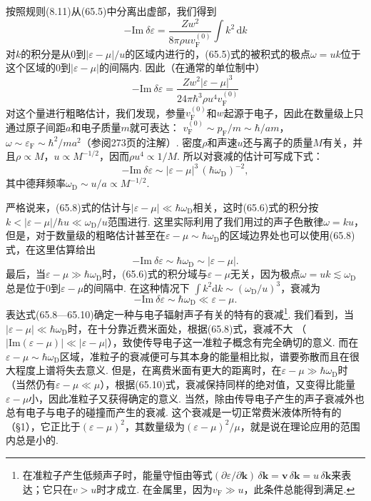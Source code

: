 按照规则(8.11)从(65.5)中分离出虚部，我们得到
\begin{equation}
-\mathrm{Im}\ \delta\varepsilon=\frac{Zw^2}{8\pi\rho uv^{(0)}_{\mathrm F}}
\int k^2\,\mathrm{d}k
\end{equation}
对$k$的积分是从0到$|\varepsilon-\mu|/u$的区域内进行的，(65.5)式的被积式的极点$\omega=uk$位于这个区域的0到$|\varepsilon-\mu|$的间隔内. 因此（在通常的单位制中）
\begin{equation}
-\mathrm{Im}\ \delta\varepsilon=
\frac{Zw^2|\varepsilon-\mu|^3}{24\pi\hbar^3\rho u^4v^{(0)}_{\mathrm F}}
\end{equation}
对这个量进行粗略估计，我们发现，参量$v^{(0)}_{\mathrm F}$和$w$起源于电子，因此在数量级上只通过原子间距$a$和电子质量$m$就可表达：
$v^{(0)}_{\mathrm F}\sim p_{\mathrm F}/m\sim\hbar/am$，
$\omega\sim\varepsilon_{\mathrm F}\sim\hbar^2/ma^2$（参阅273页的注解）. 密度$\rho$和声速$u$还与离子的质量$M$有关，并且$\rho\propto M$，$u\propto M^{-1/2}$，因而$\rho u^4\propto1/M$. 所以对衰减的估计可写成下式：
\begin{equation}
-\mathrm{Im}\ \delta\varepsilon\sim
|\varepsilon-\mu|^3\,(\hbar\omega_{\mathrm D})^{-2},
\end{equation}
其中德拜频率$\omega_{\mathrm D}\sim u/a\propto M^{-1/2}$.

严格说来，(65.8)式的估计与$|\varepsilon-\mu|\ll\hbar\omega_{\mathrm D}$相关，这时(65.6)式的积分按$k<|\varepsilon-\mu|/\hbar u\ll\omega_{\mathrm D}/u$范围进行. 这里实际利用了我们用过的声子色散律$\omega=ku$，但是，对于数量级的粗略估计甚至在$\varepsilon-\mu\sim\hbar\omega_{\mathrm D}$的区域边界处也可以使用(65.8)式，在这里估算给出
\begin{equation}
-\mathrm{Im}\ \delta\varepsilon\sim\hbar\omega_{\mathrm D}\sim|\varepsilon-\mu|.
\end{equation}
最后，当$\varepsilon-\mu\gg\hbar\omega_{\mathrm D}$时，(65.6)式的积分域与$\varepsilon-\mu$无关，因为极点$\omega=uk\lesssim\omega_{\mathrm D}$总是位于0到$\varepsilon-\mu$的间隔中. 在这种情况下
$\int k^2\mathrm{d}k\sim(\omega_{\mathrm D}/u)^3$，衰减为
\begin{equation}
-\mathrm{Im}\ \delta\varepsilon\sim\hbar\omega_{\mathrm D}\ll\varepsilon-\mu.
\end{equation}
表达式(65.8—65.10)确定一种与电子辐射声子有关的特有的衰减\footnote{在准粒子产生低频声子时，能量守恒由等式$(\partial\varepsilon/\partial\bm k)\,\delta\bm k=\bm v\,\delta\bm k=u\,\delta\bm k$来表达；它只在$v>u$时才成立. 在金属里，因为$v_{\mathrm F}\gg u$，此条件总能得到满足.}. 我们看到，当$|\varepsilon-\mu|\ll\hbar\omega_{\mathrm D}$时，在十分靠近费米面处，根据(65.8)式，衰减不大
（$|\mathrm{Im}(\varepsilon-\mu)|\ll|\varepsilon-\mu|$），致使传导电子这一准粒子概念有完全确切的意义. 而在$\varepsilon-\mu\sim\hbar\omega_{\mathrm D}$区域，准粒子的衰减便可与其本身的能量相比拟，谱要弥散而且在很大程度上谱将失去意义. 但是，在离费米面有更大的距离时，在$\varepsilon-\mu\gg\hbar\omega_{\mathrm D}$时（当然仍有$\varepsilon-\mu\ll\mu$），根据(65.10)式，衰减保持同样的绝对值，又变得比能量$\varepsilon-\mu$小，因此准粒子又获得确定的意义. 当然，除由传导电子产生的声子衰减外也总有电子与电子的碰撞而产生的衰减. 这个衰减是一切正常费米液体所特有的（§1），它正比于$(\varepsilon-\mu)^2$，其数量级为$(\varepsilon-\mu)^2/\mu$，就是说在理论应用的范围内总是小的.


